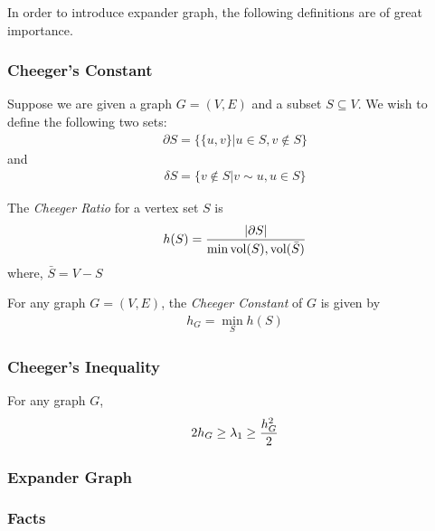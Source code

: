 In order to introduce expander graph, the following definitions are of great importance.

\subsubsection{Cheeger's Constant}
Suppose we are given a graph $G=(V,E)$ and a subset $S\subseteq V$. We wish to define the following
two sets:
\begin{eqnarray*}
	\partial S=\{\{u,v\}|u\in S, v\not\in S\}
\end{eqnarray*}
and
\begin{eqnarray*}
	\delta S=\{v\not\in S|v\sim u, u\in S\}
\end{eqnarray*}

\begin{definition}
	The \emph{Cheeger Ratio} for a vertex set $S$ is
	\begin{eqnarray*}
		h(S)={|\partial S|\over\min{\text{vol}(S),\text{vol}(\bar{S})}}
	\end{eqnarray*}
	where, $\bar{S}=V-S$
\end{definition}

\begin{definition}
	For any graph $G=(V,E)$, the \emph{Cheeger Constant} of $G$ is given by
	\begin{eqnarray*}
		h_G=\min_{S}h(S)
	\end{eqnarray*}
\end{definition}

\subsubsection{Cheeger's Inequality}
\begin{theorem}
	For any graph $G$,
	\begin{eqnarray*}
		2h_G\ge \lambda_1\ge {h_G^2\over 2}
	\end{eqnarray*}
\end{theorem}

\subsubsection{Expander Graph}


\subsubsection{Facts}
